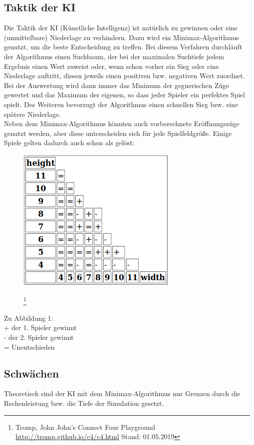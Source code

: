 \documentclass[12pt,a4paper,ngerman]{article}
\begin{document}
	\subsection{Taktik der KI}
	Die Taktik der KI (Künstliche Intelligenz) ist natürlich zu gewinnen oder eine (unmittelbare) Niederlage zu verhindern. Dazu wird ein Minimax-Algorithmus genutzt, um die beste Entscheidung zu treffen. Bei diesem Verfahren durchläuft der Algorithmus einen Suchbaum, der bei der maximalen Suchtiefe jedem Ergebnis einen Wert zuweist oder, wenn schon vorher ein Sieg oder eine Niederlage auftritt, diesen jeweils einen positiven bzw. negativen Wert zuordnet. Bei der Auswertung wird dann immer das Minimum der gegnerischen Züge gewertet und das Maximum der eigenen, so dass jeder Spieler ein \glqq perfektes \grqq{} Spiel spielt. Des Weiteren bevorzugt der Algorithmus einen schnellen Sieg bzw. eine spätere Niederlage.
		\\
	Neben dem Minimax-Algorithmus könnten auch vorberechnete Eröffnungszüge genutzt werden, aber diese unterscheiden sich für jede Spielfeldgröße. Einige Spiele gelten dadurch auch schon als gelöst:
	\begin{figure}[h]
		\centering
		\includegraphics[width=0.5\linewidth, height=0.3\textheight]{w-h-viergew}
		\caption{}
		\label{fig:w-h-viergew}
		\footnote{Tromp, John  \glqq John's Connect Four Playground \grqq{} \url{http://tromp.github.io/c4/c4.html} Stand: 01.05.2019}
	\end{figure}
    \newpage
	Zu Abbildung 1:\\
	+ der 1. Spieler gewinnt\\
	- der 2. Spieler gewinnt\\
	= Unentschieden\\
	
	
	
	\subsection{Schwächen}
	Theoretisch sind der KI mit dem Minimax-Algorithmus nur Grenzen durch die Rechenleistung bzw. die Tiefe der Simulation gesetzt.
	
\end{document}
